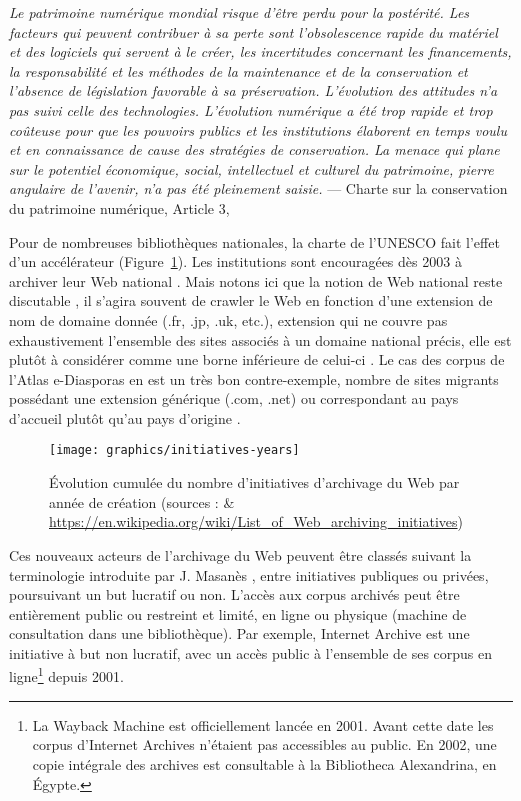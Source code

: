 \documentclass[symmetric,justified,marginals=raggedouter]{tufte-book}
\begin{document}
\begin{fullwidth}
\og\textit{Le  patrimoine  numérique  mondial  risque  d'être  perdu  pour  la  postérité.  Les  facteurs  qui  peuvent  contribuer  à  sa  perte  sont  l'obsolescence  rapide  du  matériel  et  des  logiciels  qui  servent  à  le  créer,  les  incertitudes  concernant  les  financements,  la  responsabilité  et  les  méthodes  de  la  maintenance  et  de  la  conservation et l'absence de législation favorable à sa préservation. L'évolution des attitudes n'a pas suivi celle des technologies. L'évolution numérique a été trop rapide et trop coûteuse pour que les pouvoirs publics et les institutions élaborent en temps voulu et en connaissance de cause des stratégies de conservation. La menace qui plane sur le potentiel économique, social, intellectuel et culturel du patrimoine, pierre angulaire de l'avenir, n'a pas été pleinement saisie.}\fg{} --- Charte sur la conservation du patrimoine numérique, Article 3, \citep{unesco_charter_2003}\\
\end{fullwidth}

\noindent Pour de nombreuses bibliothèques nationales, la charte de l'UNESCO fait l'effet d'un accélérateur (Figure~\ref{fig:date-initiative}). Les institutions sont encouragées dès 2003 à archiver leur Web national \citep{gomes_survey_2011}. Mais notons ici que la notion de Web national reste discutable \citep{abiteboul_first_2002}, il s'agira souvent de crawler le Web en fonction d'une extension de nom de domaine donnée (.fr, .jp, .uk, etc.), extension qui ne couvre pas exhaustivement l'ensemble des sites associés à un domaine national précis, elle est plutôt à considérer comme une borne inférieure de celui-ci \citep{koehler_analysis_1999}. Le cas des corpus de l'Atlas e-Diasporas en est un très bon contre-exemple, nombre de sites migrants possédant une extension générique (.com, .net) ou correspondant au pays d'accueil plutôt qu'au pays d'origine \citep{leclerc_cyberespace_2012}.  

\begin{figure}%
  \texttt{[image: graphics/initiatives-years]}
  \caption{Évolution cumulée du nombre d'initiatives d'archivage du Web par année de création (sources : \citep{gomes_survey_2011} \& \url{https://en.wikipedia.org/wiki/List_of_Web_archiving_initiatives})}
  \label{fig:date-initiative}
\end{figure} 

\noindent Ces nouveaux acteurs de l'archivage du Web peuvent être classés suivant la terminologie introduite par J. Masanès \citep[p.76]{masanes_web_2006}, entre initiatives publiques ou privées, poursuivant un but lucratif ou non. L'accès aux corpus archivés peut être entièrement public ou restreint et limité, en ligne ou physique (machine de consultation dans une bibliothèque). Par exemple, Internet Archive est une initiative à but non lucratif, avec un accès public à l'ensemble de ses corpus en ligne\footnote{\RaggedOuter La Wayback Machine est officiellement lancée en 2001. Avant cette date les corpus d'Internet Archives n'étaient pas accessibles au public. En 2002, une copie intégrale des archives est consultable à la Bibliotheca Alexandrina, en Égypte.} depuis 2001. 
\end{document}
